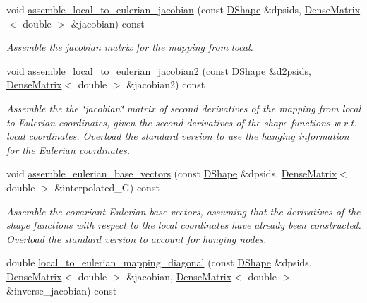 \begin{DoxyCompactItemize}
\item 
void \hyperlink{classoomph_1_1RefineableElement_a9936fe72471f1bd977b800c9e5696949}{assemble\+\_\+local\+\_\+to\+\_\+eulerian\+\_\+jacobian} (const \hyperlink{classoomph_1_1DShape}{D\+Shape} \&dpsids, \hyperlink{classoomph_1_1DenseMatrix}{Dense\+Matrix}$<$ double $>$ \&jacobian) const
\begin{DoxyCompactList}\small\item\em Assemble the jacobian matrix for the mapping from local. \end{DoxyCompactList}\item 
void \hyperlink{classoomph_1_1RefineableElement_a16ee7ab5ebf6d105815d49e1a23aa2ca}{assemble\+\_\+local\+\_\+to\+\_\+eulerian\+\_\+jacobian2} (const \hyperlink{classoomph_1_1DShape}{D\+Shape} \&d2psids, \hyperlink{classoomph_1_1DenseMatrix}{Dense\+Matrix}$<$ double $>$ \&jacobian2) const
\begin{DoxyCompactList}\small\item\em Assemble the the \char`\"{}jacobian\char`\"{} matrix of second derivatives of the mapping from local to Eulerian coordinates, given the second derivatives of the shape functions w.\+r.\+t. local coordinates. Overload the standard version to use the hanging information for the Eulerian coordinates. \end{DoxyCompactList}\item 
void \hyperlink{classoomph_1_1RefineableElement_abd80668ecabd71ea8d992cfaabb6633c}{assemble\+\_\+eulerian\+\_\+base\+\_\+vectors} (const \hyperlink{classoomph_1_1DShape}{D\+Shape} \&dpsids, \hyperlink{classoomph_1_1DenseMatrix}{Dense\+Matrix}$<$ double $>$ \&interpolated\+\_\+G) const
\begin{DoxyCompactList}\small\item\em Assemble the covariant Eulerian base vectors, assuming that the derivatives of the shape functions with respect to the local coordinates have already been constructed. Overload the standard version to account for hanging nodes. \end{DoxyCompactList}\item 
double \hyperlink{classoomph_1_1RefineableElement_a4edbc4a35b1b37b346c802b0a04f2f82}{local\+\_\+to\+\_\+eulerian\+\_\+mapping\+\_\+diagonal} (const \hyperlink{classoomph_1_1DShape}{D\+Shape} \&dpsids, \hyperlink{classoomph_1_1DenseMatrix}{Dense\+Matrix}$<$ double $>$ \&jacobian, \hyperlink{classoomph_1_1DenseMatrix}{Dense\+Matrix}$<$ double $>$ \&inverse\+\_\+jacobian) const

\end{DoxyCompactItemize}

